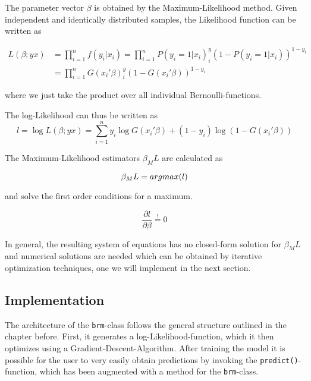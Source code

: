 \documentclass{article}
\begin{document}
The parameter vector $\beta$ is obtained by the Maximum-Likelihood method. Given independent and identically distributed samples, the Likelihood function can be written as

\begin{equation}
\begin{split}
L(\beta;y x) &= \prod_{i=1}^{n} f(y_i | x_i)
              =\prod_{i=1}^{n} P(y_i=1|x_i)^y_i\left(1-P(y_i=1|x_i)\right)^{1-y_i} \\
            & =\prod_{i=1}^{n} G(x_i\prime \beta)^y_i\left(1-G(x_i\prime \beta)\right)^{1-y_i}
\end{split}
\end{equation}

where we just take the product over all individual Bernoulli-functions.

The log-Likelihood can thus be written as
\begin{equation}
\label{logL}
l = \log L(\beta;y x) = \sum_{i=1}^{n} y_i \log G(x_i\prime \beta) +(1-y_i) \log (1-G(x_i\prime \beta))
\end{equation}

The Maximum-Likelihood estimators $\beta_ML$ are calculated as

\begin{equation}
\beta_ML = argmax(l) \\
\end{equation}

and solve the first order conditions for a maximum.

\begin{equation}
\frac{\partial l}{\partial \beta} \stackrel{!}{=} 0
\end{equation}

In general, the resulting system of equations has no closed-form solution for $\beta_ML$ and numerical solutions are needed which can be obtained by iterative optimization techniques, one we will implement in the next section.\cite{winkel09}

\subsection{Implementation}

The architecture of the \texttt{brm}-class follows the general structure outlined in the chapter before. First, it generates a log-Likelihood-function, which it then optimizes using a Gradient-Descent-Algorithm. After training the model it is possible for the user to very easily obtain predictions by invoking the \texttt{predict()}-function, which has been augmented with a method for the \texttt{brm}-class.
\end{document}
